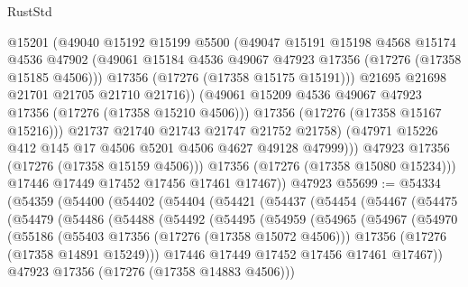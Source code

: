 \begin{lexlean}{RustStd}
\begin{coremodule}
                      @15201
                      (@49040
                        @15192
                        @15199
                        @5500
                        (@49047
                          @15191
                          @15198
                          @4568
                          @15174
                          @4536
                          @47902
                          (@49061 @15184 @4536 @49067 @47923 @17356 (@17276 (@17358 @15185 @4506)))
                          @17356
                          (@17276 (@17358 @15175 @15191)))
                        @21695
                        @21698
                        @21701
                        @21705
                        @21710
                        @21716))
                    (@49061 @15209 @4536 @49067 @47923 @17356 (@17276 (@17358 @15210 @4506)))
                    @17356
                    (@17276 (@17358 @15167 @15216)))
                  @21737
                  @21740
                  @21743
                  @21747
                  @21752
                  @21758)
                (@47971 @15226 @412 @145 @17 @4506 @5201 @4506 @4627 @49128 @47999)))
            @47923
            @17356
            (@17276 (@17358 @15159 @4506)))
          @17356
          (@17276 (@17358 @15080 @15234)))
        @17446
        @17449
        @17452
        @17456
        @17461
        @17467))
    @47923
@55699 := @54334
    (@54359
      (@54400
        (@54402
          (@54404
            (@54421
              (@54437
                (@54454
                  (@54467
                    (@54475
                      (@54479
                        (@54486
                          (@54488
                            (@54492
                              (@54495
                                (@54959
                                  (@54965
                                    (@54967
                                      (@54970
                                        (@55186
                                          (@55403 @17356 (@17276 (@17358 @15072 @4506)))
                                          @17356
                                          (@17276 (@17358 @14891 @15249)))
                                        @17446
                                        @17449
                                        @17452
                                        @17456
                                        @17461
                                        @17467))
                                    @47923
                                    @17356
                                    (@17276 (@17358 @14883 @4506)))

\end{coremodule}
\end{lexlean}
